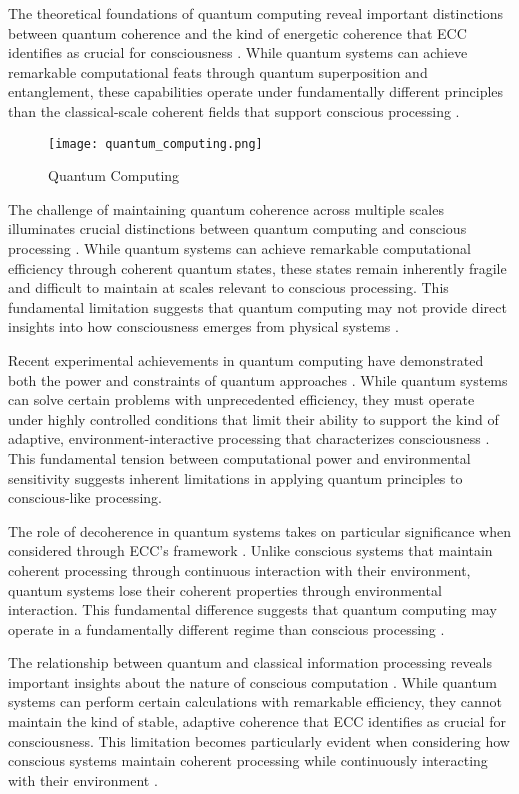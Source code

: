 The theoretical foundations of quantum computing reveal important distinctions between quantum coherence and the kind of energetic coherence that ECC identifies as crucial for consciousness \cite{Shor2019}. While quantum systems can achieve remarkable computational feats through quantum superposition and entanglement, these capabilities operate under fundamentally different principles than the classical-scale coherent fields that support conscious processing \cite{Svore2020}.

\begin{figure}[h]
    \centering
    \texttt{[image: quantum\_computing.png]}

    \caption{Quantum Computing}
\end{figure}

The challenge of maintaining quantum coherence across multiple scales illuminates crucial distinctions between quantum computing and conscious processing \cite{Terhal2018}. While quantum systems can achieve remarkable computational efficiency through coherent quantum states, these states remain inherently fragile and difficult to maintain at scales relevant to conscious processing. This fundamental limitation suggests that quantum computing may not provide direct insights into how consciousness emerges from physical systems \cite{Wallraff2021}.

Recent experimental achievements in quantum computing have demonstrated both the power and constraints of quantum approaches \cite{Zhong2020}. While quantum systems can solve certain problems with unprecedented efficiency, they must operate under highly controlled conditions that limit their ability to support the kind of adaptive, environment-interactive processing that characterizes consciousness \cite{Aaronson2021a}. This fundamental tension between computational power and environmental sensitivity suggests inherent limitations in applying quantum principles to conscious-like processing.

The role of decoherence in quantum systems takes on particular significance when considered through ECC's framework \cite{Arute2019}. Unlike conscious systems that maintain coherent processing through continuous interaction with their environment, quantum systems lose their coherent properties through environmental interaction. This fundamental difference suggests that quantum computing may operate in a fundamentally different regime than conscious processing \cite{Bernstein2018}.

The relationship between quantum and classical information processing reveals important insights about the nature of conscious computation \cite{Deutsch2020}. While quantum systems can perform certain calculations with remarkable efficiency, they cannot maintain the kind of stable, adaptive coherence that ECC identifies as crucial for consciousness. This limitation becomes particularly evident when considering how conscious systems maintain coherent processing while continuously interacting with their environment \cite{DiVincenzo2019}.

